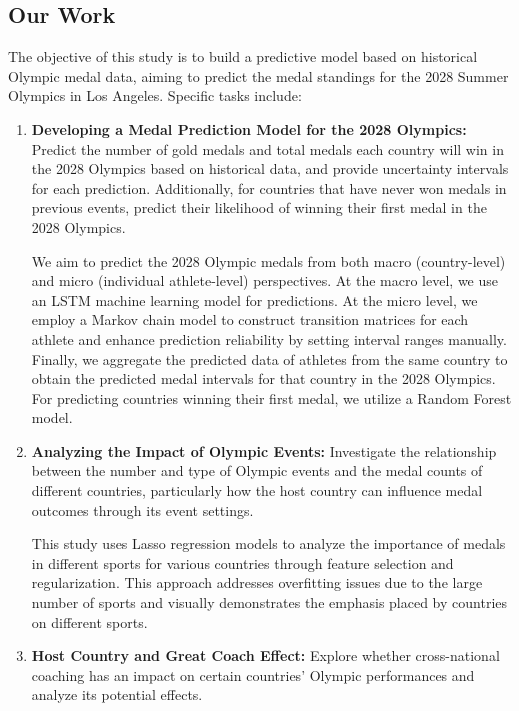 \documentclass[12pt]{article}
\begin{document}
\subsection{Our Work}

The objective of this study is to build a predictive model based on historical Olympic medal data, aiming to predict the medal standings for the 2028 Summer Olympics in Los Angeles. Specific tasks include:

\begin{enumerate}
    \item \textbf{Developing a Medal Prediction Model for the 2028 Olympics:}
    Predict the number of gold medals and total medals each country will win in the 2028 Olympics based on historical data, and provide uncertainty intervals for each prediction. Additionally, for countries that have never won medals in previous events, predict their likelihood of winning their first medal in the 2028 Olympics.

    We aim to predict the 2028 Olympic medals from both macro (country-level) and micro (individual athlete-level) perspectives. At the macro level, we use an LSTM machine learning model for predictions. At the micro level, we employ a Markov chain model to construct transition matrices for each athlete and enhance prediction reliability by setting interval ranges manually. Finally, we aggregate the predicted data of athletes from the same country to obtain the predicted medal intervals for that country in the 2028 Olympics. For predicting countries winning their first medal, we utilize a Random Forest model.

    \item \textbf{Analyzing the Impact of Olympic Events:}
    Investigate the relationship between the number and type of Olympic events and the medal counts of different countries, particularly how the host country can influence medal outcomes through its event settings.

    This study uses Lasso regression models to analyze the importance of medals in different sports for various countries through feature selection and regularization. This approach addresses overfitting issues due to the large number of sports and visually demonstrates the emphasis placed by countries on different sports.

    \item \textbf{Host Country and Great Coach Effect:}
    Explore whether cross-national coaching has an impact on certain countries' Olympic performances and analyze its potential effects.


\end{enumerate}
\end{document}
